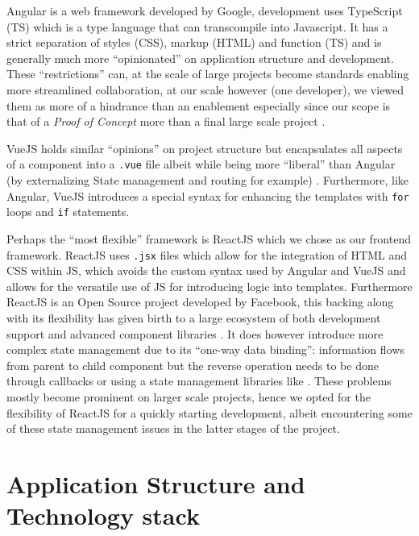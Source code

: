 \documentclass{l4proj}
\begin{document}
Angular is a web framework developed by Google, development uses TypeScript (TS) which is a type language that can transcompile into Javascript.
It has a strict separation of styles (CSS), markup (HTML) and function (TS) and is generally much more ``opinionated'' on application structure and development.
These ``restrictions'' can, at the scale of large projects become standards enabling more streamlined collaboration, at our scale however (one developer), we viewed them as more of a hindrance than an enablement especially since our scope is that of a \textit{Proof of Concept} more than a final large scale project \autocite{wohlgethanSupportingWebDevelopmentDecisions2018}.

VueJS holds similar ``opinions'' on project structure but encapsulates all aspects of a component into a \lstinline{.vue} file albeit while being more ``liberal'' than Angular (by externalizing State management and routing for example) \autocite{wohlgethanSupportingWebDevelopmentDecisions2018}.
Furthermore, like Angular, VueJS introduces a special syntax for enhancing the templates with \lstinline{for} loops and \lstinline{if} statements.

Perhaps the ``most flexible'' framework is ReactJS which we chose as our frontend framework.
ReactJS uses \lstinline{.jsx} files which allow for the integration of HTML and CSS within JS, which avoids the custom syntax used by Angular and VueJS and allows for the versatile use of JS for introducing logic into templates.
Furthermore ReactJS is an Open Source project developed by Facebook, this backing along with its flexibility has given birth to a large ecosystem of both development support and advanced component libraries \autocite{wohlgethanSupportingWebDevelopmentDecisions2018}.
It does however introduce more complex state management due to its ``one-way data binding'': information flows from parent to child component but the reverse operation needs to be done through callbacks or using a state management libraries like \textcite{ReduxjsRedux2020}.
These problems mostly become prominent on larger scale projects, hence we opted for the flexibility of ReactJS for a quickly starting development, albeit encountering some of these state management issues in the latter stages of the project.

\section{Application Structure and Technology stack}
\end{document}
